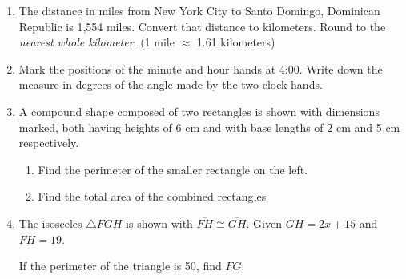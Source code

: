 \begin{enumerate}
\item The distance in miles from New York City to Santo Domingo, Dominican Republic is 1,554 miles. Convert that distance to kilometers. Round to the \emph{nearest whole kilometer}. (1 mile $\approx$ 1.61 kilometers) \vspace{2cm}

\newpage
\item Mark the positions of the minute and hour hands at 4:00. Write down the measure in degrees of the angle made by the two clock hands. \par \vspace{0.25cm}

\item A compound shape composed of two rectangles is shown with dimensions marked, both having heights of 6 cm and with base lengths of 2 cm and 5 cm respectively.
  \begin{multicols}{2}
    \begin{enumerate}
      \item Find the perimeter of the smaller rectangle on the left. \vspace{2cm}
      \item Find the total area of the combined rectangles
      \end{enumerate}
    \end{multicols} \vspace{1cm}
    \item The isosceles $\triangle FGH$ is shown with $\overline{FH} \cong \overline{GH}$. Given $GH=2x+15$ and $FH=19$. \par \smallskip
    If the perimeter of the triangle is 50, find $FG$. \par \smallskip
       \vspace{2cm}
    

\end{enumerate}
